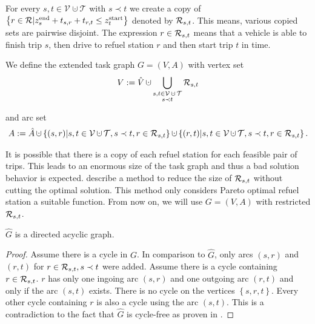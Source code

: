 \begin{definition}

For every $s,t\in \mathcal{V}\cupdot\mathcal{T}$ with $s\prec t$ we create a copy of $\left\{r\in\mathcal{R}|z^{\operatorname{end}}_s+t_{s,r}+t_{r,t}\leq z^{\operatorname{start}}_t\right\}$ denoted by $\mathcal{R}_{s,t}$. This means, various copied sets are pairwise disjoint. The expression $r\in\mathcal{R}_{s,t}$ means that a vehicle is able to finish trip $s$, then drive to refuel station $r$ and then start trip $t$ in time.

We define the extended task graph $G=(V,A)$ with vertex set
\begin{align*}
	V:=\hat{V}\cupdot\Cupdot_{\substack{s,t\in\mathcal{V}\cupdot\mathcal{T} \\ s\prec t}} \Rst
\end{align*}

and arc set
\begin{align*}
	A:=\hat{A}\cupdot\left\{(s,r)|s,t\in\mathcal{V}\cupdot\mathcal{T},s\prec t,r\in\Rst\right\}\cupdot\left\{(r,t)|s,t\in\mathcal{V}\cupdot\mathcal{T},s\prec t,r\in\Rst\right\}.
\end{align*}

It is possible that there is a copy of each refuel station for each feasible pair of trips. This leads to an enormous size of the task graph and thus a bad solution behavior is expected. \cite[pp. 24-30]{Kaiser_Knoll} describe a method to reduce the size of $\mathcal{R}_{s,t}$ without cutting the optimal solution. This method only considers Pareto optimal refuel station \wrt a suitable function. From now on, we will use $G=(V,A)$ with restricted $\mathcal{R}_{s,t}$.

\end{definition}

\begin{lemma}

$\hat{G}$ is a directed acyclic graph.

\end{lemma}

\begin{proof}

Assume there is a cycle in $G$. In comparison to $\hat{G}$, only arcs $(s,r)$ and $(r,t)$ for ${r\in\mathcal{R}_{s,t}, s\prec t}$ were added. Assume there is a cycle containing $r\in\mathcal{R}_{s,t}$. $r$ has only one ingoing arc $(s,r)$ and one outgoing arc $(r,t)$ and only if the arc $(s,t)$ exists. There is no cycle on the vertices $\left\{s,r,t\right\}$. Every other cycle containing $r$ is also a cycle using the arc $(s,t)$. This is a contradiction to the fact that $\hat{G}$ is cycle-free as proven in .

\end{proof}

